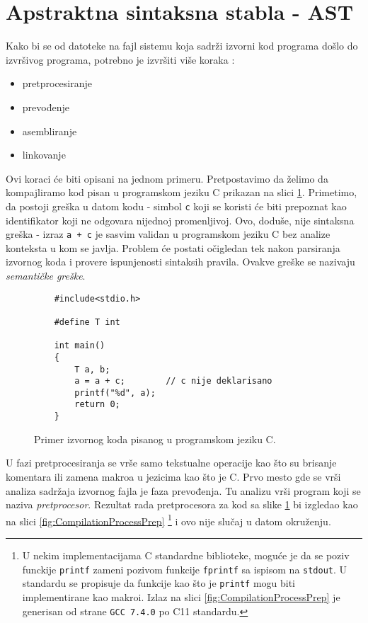 \section{Apstraktna sintaksna stabla - AST}
\label{sec:AST}

Kako bi se od datoteke na fajl sistemu koja sadrži izvorni kod programa 
došlo do izvršivog programa, potrebno je izvršiti više koraka 
\cite{CompilerConstruction}:
\begin{itemize}
    \item pretprocesiranje
    \item prevođenje
    \item asembliranje
    \item linkovanje
\end{itemize}

Ovi koraci će biti opisani na jednom primeru. Pretpostavimo da želimo 
da kompajliramo kod pisan u programskom jeziku C prikazan na slici 
\ref{fig:CompilationProcessInit}. Primetimo, da postoji greška u datom
kodu - simbol \texttt{c} koji se koristi će biti prepoznat kao 
identifikator koji ne odgovara nijednoj promenljivoj. Ovo, doduše, nije
sintaksna greška - izraz \texttt{a + c} je sasvim validan u programskom
jeziku C bez analize konteksta u kom se javlja. Problem će postati 
očigledan tek nakon parsiranja izvornog koda i provere ispunjenosti 
sintaksih pravila. Ovakve greške se nazivaju \emph{semantičke greške}.

\begin{figure}[h!]
    \begin{lstlisting}
    #include<stdio.h>

    #define T int

    int main()
    {
        T a, b;
        a = a + c;        // c nije deklarisano
        printf("%d", a);
        return 0;
    }
    \end{lstlisting}
    \caption{Primer izvornog koda pisanog u programskom jeziku C.}
    \label{fig:CompilationProcessInit}
\end{figure}

U fazi pretprocesiranja se vrše samo tekstualne operacije kao što su
brisanje komentara ili zamena makroa u jezicima kao što je C. Prvo 
mesto gde se vrši analiza sadržaja izvornog fajla je faza prevođenja.
Tu analizu vrši program koji se naziva \emph{pretprocesor}. Rezultat 
rada pretprocesora za kod sa slike \ref{fig:CompilationProcessInit} 
bi izgledao kao na slici \ref{fig:CompilationProcessPrep} \footnote{
U nekim implementacijama C standardne biblioteke, moguće je da se 
poziv funckije \texttt{printf} zameni pozivom funkcije \texttt{fprintf}
sa ispisom na \texttt{stdout}. U standardu se propisuje da funkcije 
kao što je \texttt{printf} mogu biti implementirane kao makroi. Izlaz 
na slici \ref{fig:CompilationProcessPrep} je generisan od strane 
\texttt{GCC 7.4.0} po C11 standardu.} i ovo nije slučaj u datom 
okruženju.

